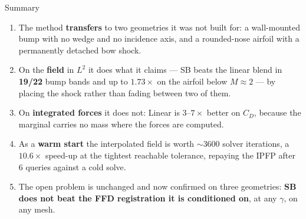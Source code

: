 \documentclass[aspectratio=169]{beamer}
\newcommand{\win}[1]{\textcolor{green!55!black}{\textbf{#1}}}
\begin{document}
\begin{frame}{Summary}

\begin{enumerate}
    \item The method \textbf{transfers} to two geometries it was not built for:
          a wall-mounted bump with no wedge and no incidence axis, and a
          rounded-nose airfoil with a permanently detached bow shock.
    \item On the \textbf{field} in $L^2$ it does what it claims — SB beats the
          linear blend in \win{19/22} bump bands and up to \win{$1.73\times$} on
          the airfoil below $M\approx2$ — by placing the shock rather than
          fading between two of them.
    \item On \textbf{integrated forces} it does not: Linear is $3$--$7\times$
          better on $C_D$, because the marginal carries no mass where the
          forces are computed.
    \item As a \textbf{warm start} the interpolated field is worth
          $\sim$3600 solver iterations, a $10.6\times$ speed-up at the tightest
          reachable tolerance, repaying the IPFP after 6 queries against a cold
          solve.
    \item The open problem is unchanged and now confirmed on three geometries:
          \textbf{SB does not beat the FFD registration it is conditioned on},
          at any $\gamma$, on any mesh.
\end{enumerate}

\end{frame}
\end{document}
